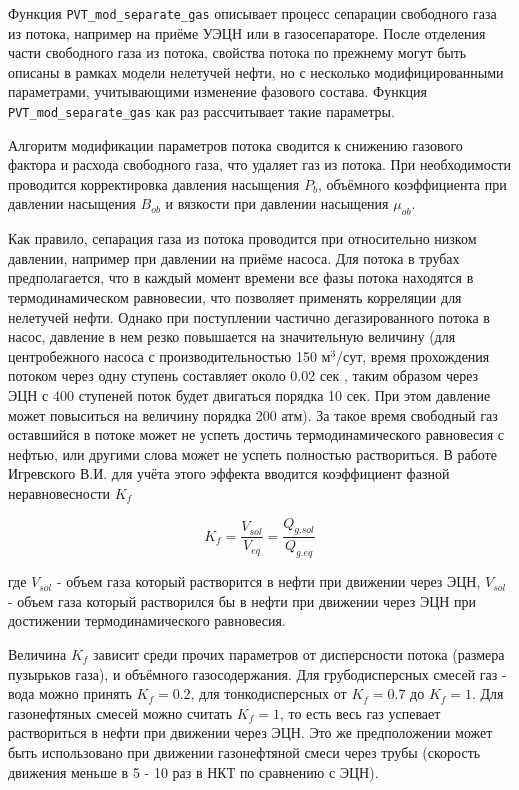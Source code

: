 Функция \texttt{PVT_mod_separate_gas} описывает процесс сепарации свободного газа из потока, например на приёме УЭЦН или в газосепараторе.
После отделения части свободного газа из потока, свойства потока по прежнему могут быть описаны в рамках модели нелетучей нефти, но с несколько модифицированными параметрами, учитывающими изменение фазового состава. Функция \texttt{PVT_mod_separate_gas} как раз рассчитывает такие параметры.

Алгоритм модификации параметров потока сводится к снижению газового фактора и расхода свободного газа, что удаляет газ из потока. При необходимости проводится корректировка давления насыщения $P_b$, объёмного коэффициента при давлении насыщения $B_{ob}$ и вязкости при давлении насыщения $\mu_{ob}$. 

Как правило, сепарация газа из потока проводится при относительно низком давлении, например при давлении на приёме насоса. Для потока в трубах предполагается, что  в каждый момент времени все фазы потока находятся в термодинамическом равновесии, что позволяет применять корреляции для нелетучей нефти.  Однако при поступлении частично дегазированного потока в насос, давление в нем резко повышается на значительную величину (для центробежного насоса с производительностью 150 м$^3$/сут, время прохождения потоком через одну ступень составляет около 0.02 сек \cite{diss_Igrevesky_ESP_gas}, таким образом через ЭЦН с 400 ступеней поток будет двигаться порядка 10 сек. При этом давление может повыситься на величину порядка 200 атм). За такое время свободный газ оставшийся в потоке может не успеть достичь термодинамического равновесия с нефтью, или другими слова может не успеть полностью раствориться. В работе Игревского В.И. \cite{diss_Igrevesky_ESP_gas} для учёта этого эффекта вводится коэффициент фазной неравновесности $K_f$

$$K_f = \frac{V_{sol}}{V_{eq}}= \frac{Q_{g.sol}}{Q_{g.eq}}$$

где  $V_{sol}$ - объем газа который растворится в нефти при движении через ЭЦН, $V_{sol}$ - объем газа который растворился бы в нефти при движении через ЭЦН при достижении термодинамического равновесия. 

Величина $K_f$ зависит среди прочих параметров от дисперсности потока (размера пузырьков газа), и объёмного газосодержания.  Для грубодисперсных смесей газ - вода можно принять $K_f=0.2$, для тонкодисперсных от $K_f=0.7$ до $K_f=1$. Для газонефтяных смесей можно считать $K_f=1$, то есть весь газ успевает раствориться в нефти при движении через ЭЦН. Это же предположении может быть использовано при движении газонефтяной смеси через трубы (скорость движения меньше в 5 - 10 раз в НКТ по сравнению с ЭЦН).

